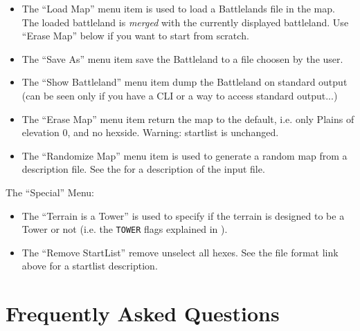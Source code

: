 \documentclass{article}
\begin{document}
\begin{itemize}

\item The ``Load Map'' menu item is used to load a Battlelands 
file in the map. The loaded battleland is \emph{merged}
with the currently displayed battleland. Use ``Erase Map''
below if you want to start from scratch.

\item The ``Save As'' menu item save the Battleland to a
file choosen by the user.

\item The ``Show Battleland'' menu item dump the Battleland
on standard output (can be seen only if you have a CLI
or a way to access standard output...)

\item The ``Erase Map'' menu item return the map to the
default, i.e. only Plains of elevation 0, and no
hexside. Warning: startlist is unchanged.

\item The ``Randomize Map'' menu item is used to generate
a random map from a description file. See the
for a description of the input file.

\end{itemize}

The ``Special'' Menu:

\begin{itemize}

\item The ``Terrain is a Tower'' is used to specify if the terrain is designed to be a Tower or not (i.e. the \texttt{TOWER} flags explained in ).

\item The ``Remove StartList'' remove unselect all hexes. See the file format
link above for a startlist description.

\end{itemize}

\section{Frequently Asked Questions}
\end{document}
